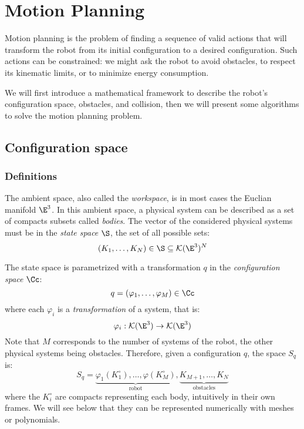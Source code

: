 \section{Motion Planning}
Motion planning is the problem of finding a sequence of valid actions that will transform the robot from its initial configuration to a desired configuration. Such actions can be constrained: we might ask the robot to avoid obstacles, to respect its kinematic limits, or to minimize energy consumption. 

We will first introduce a mathematical framework to describe the robot's configuration space, obstacles, and collision, then we will present some algorithms to solve the motion planning problem.

\subsection{Configuration space}
\subsubsection{Definitions}
The ambient space, also called the \emph{workspace}, is in most cases the Euclian manifold $\E^3$. In this ambient space, a physical system can be described as a set of compacts subsets called \emph{bodies}. The vector of the considered physical systems must be in the \emph{state space} $\S$, the set of all possible sets:
\begin{equation*}
    (K_1, \dots, K_N) \in\S \subseteq \mathcal{K}(\E^3)^N
\end{equation*}

The state space is parametrized with a transformation $q$ in the \emph{configuration space} $\Cc$:
\begin{equation*}
    q = (\varphi_1, \dots, \varphi_M)\in\Cc
\end{equation*}
where each $\varphi_i$ is a \emph{transformation} of a system, that is:
\begin{equation*}
    \varphi_i: \mathcal{K}(\E^3) \to \mathcal{K}(\E^3)
\end{equation*}
Note that $M$ corresponds to the number of systems of the robot, the other physical systems being obstacles. Therefore, given a configuration $q$, the space $S_q$ is:
\begin{equation*}
    S_q = \underbrace{\varphi_1(K_1^\circ), \dots, \varphi(K_M^\circ)}_{\text{robot}}, \underbrace{K_{M+1}, \dots, K_N}_{\text{obstacles}}
\end{equation*}
where the $K_i^\circ$ are compacts representing each body, intuitively in their own frames. We will see below that they can be represented numerically with meshes or polynomials.

